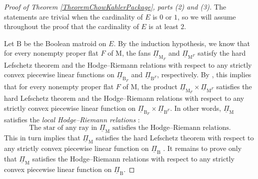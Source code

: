 \documentclass[11pt,reqno]{amsart}
\theoremstyle{definition}
\theoremstyle{remark}
\renewcommand{\(}{\left(}
\renewcommand{\)}{\right)}
\newcommand{\<}{\left<}
\renewcommand{\>}{\right>}
\begin{document}
\begin{proof}[Proof of Theorem \ref{TheoremChowKahlerPackage}, parts (2) and (3)]
The statements are trivial when the cardinality of $E$ is $0$ or $1$, so we will assume throughout the proof that the cardinality
of $E$ is at least $2$.

Let $\mathrm{B}$ be the Boolean matroid on $E$.  By the induction hypothesis, we know that 
for every nonempty proper flat $F$ of $\mathrm{M}$, the fans $\underline{\Pi}_{\mathrm{M}_F}$
and $\underline{\Pi}_{\mathrm{M}^F}$ satisfy the hard Lefschetz theorem and the Hodge--Riemann relations
with respect to any strictly convex piecewise linear functions on $\underline{\Pi}_{\mathrm{B}_F}$ and $\underline{\Pi}_{\mathrm{B}^F}$,
respectively.  By \cite[Proposition 7.7]{AHK}, this implies that for every nonempty proper flat $F$ of $\mathrm{M}$,
the product $\underline{\Pi}_{\mathrm{M}_F}\times\underline{\Pi}_{\mathrm{M}^F}$
satisfies the hard Lefschetz theorem and the Hodge--Riemann relations
with respect to any strictly convex piecewise linear function on $\underline{\Pi}_{\mathrm{B}_F} \times \underline{\Pi}_{\mathrm{B}^F}$.
In other words, $\underline{\Pi}_\mathrm{M}$ satisfies the \emph{local Hodge--Riemann relations} \cite[Definition 7.14]{AHK}:
\[
\text{The star of any ray in $\underline{\Pi}_\mathrm{M}$ satisfies the Hodge--Riemann relations.}
\]
This in turn implies that $\underline{\Pi}_\mathrm{M}$ satisfies the hard Lefschetz theorem 
with respect to any strictly convex piecewise linear function on 
$\underline{\Pi}_\mathrm{B}$ \cite[Proposition 7.15]{AHK}.  It remains to prove only that 
$\underline{\Pi}_\mathrm{M}$ satisfies the Hodge--Riemann relations with respect to any strictly convex piecewise linear function on $\underline{\Pi}_\mathrm{B}$.


\end{proof}
\end{document}
